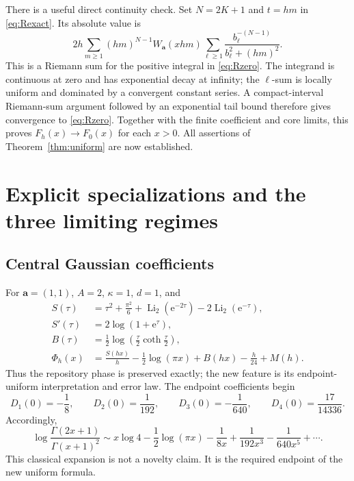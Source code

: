 \documentclass[11pt,a4paper]{article}
\numberwithin{equation}{section}
\theoremstyle{definition}\newtheorem{definition}[theorem]{Definition}
\theoremstyle{remark}\newtheorem{remark}[theorem]{Remark}
\DeclareMathOperator{\Li}{Li}
\newcommand{\e}{\mathrm e}
\newcommand{\avec}{\boldsymbol a}
\begin{document}
There is a useful direct continuity check. Set $N=2K+1$ and $t=hm$ in
\eqref{eq:Rexact}. Its absolute value is
\begin{equation}
 2h\sum_{m\ge1}(hm)^{N-1}W_{\avec}(xhm)
         \sum_{\ell\ge1}\frac{b_\ell^{-(N-1)}}{b_\ell^2+(hm)^2}.
 \label{eq:R-riemann}
\end{equation}
This is a Riemann sum for the positive integral in \eqref{eq:Rzero}. The
integrand is continuous at zero and has exponential decay at infinity; the
$\ell$-sum is locally uniform and dominated by a convergent constant series.
A compact-interval Riemann-sum argument followed by an exponential tail bound
therefore gives convergence to \eqref{eq:Rzero}. Together with the finite
coefficient and core limits, this proves $F_h(x)\to F_0(x)$ for each $x>0$.
All assertions of Theorem~\ref{thm:uniform} are now established.

\section{Explicit specializations and the three limiting regimes}
\label{sec:examples}

\subsection{Central Gaussian coefficients}
For $\avec=(1,1)$, $A=2$, $\kappa=1$, $d=1$, and
\begin{align}
 S(\tau)&=\tau^2+\frac{\pi^2}{6}
                +\Li_2(\e^{-2\tau})-2\Li_2(\e^{-\tau}),\label{eq:Scentral}\\
 S'(\tau)&=2\log(1+\e^\tau),\label{eq:Scentral-prime}\\
 B(\tau)&=\frac12\log\left(\frac\tau2\coth\frac\tau2\right),\label{eq:Bcentral}\\
 \Phi_h(x)&=\frac{S(hx)}h-\frac12\log(\pi x)
                  +B(hx)-\frac h{24}+M(h).\label{eq:central-core}
\end{align}
Thus the repository phase is preserved exactly; the new feature is its
endpoint-uniform interpretation and error law.
The endpoint coefficients begin
\begin{equation}
 D_1(0)=-\frac18,\qquad D_2(0)=\frac1{192},\qquad
 D_3(0)=-\frac1{640},\qquad D_4(0)=\frac{17}{14336}.
 \label{eq:central-coeffs}
\end{equation}
Accordingly,
\begin{equation}
 \log\frac{\Gamma(2x+1)}{\Gamma(x+1)^2}
 \sim x\log4-\frac12\log(\pi x)-\frac1{8x}
             +\frac1{192x^3}-\frac1{640x^5}+\cdots.
\end{equation}
This classical expansion is not a novelty claim. It is the required endpoint
of the new uniform formula.
\end{document}
